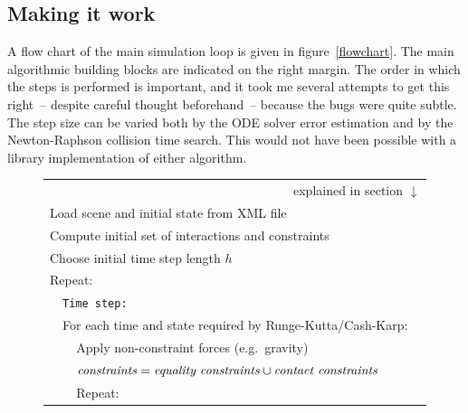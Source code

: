 \subsection{Making it work\label{algorithmImplementation}}

A flow chart of the main simulation loop is given in figure~\ref{flowchart}. The main algorithmic
building blocks are indicated on the right margin. The order in which the steps is performed is
important, and it took me several attempts to get this right~-- despite careful thought
beforehand~-- because the bugs were quite subtle. The step size can be varied both by the ODE
solver error estimation and by the Newton-Raphson collision time search. This would not have
been possible with a library implementation of either algorithm.

\begin{figure}
\renewcommand{\baselinestretch}{1.25}\small\normalsize
\newcommand{\spx}{\vspace*{\baselineskip}\\}
\newcommand{\curly}[2]{\zerobox{b}{\mbox{$\left\}\:#1\begin{array}{l}#2\end{array}\right.$}}}
\begin{tabular}{|l|l|l|l|@{}l}
\multicolumn{5}{r}{explained in section $\downarrow$}\\\cline{1-4}
\multicolumn{4}{|l|}{Load scene and initial state from XML file}
&\curly{\ref{softwareTools}}{\spx}\hspace*{7mm}\\\cline{1-4}
\multicolumn{4}{|l|}{Compute initial set of interactions and constraints}&
\curly{\ref{meshIntersection}}{\spx}\\\cline{1-4}
\multicolumn{4}{|l|}{Choose initial time step length $h$}\\\cline{1-4}
\multicolumn{4}{|l|}{Repeat:}\\\cline{2-4}
    &\multicolumn{3}{|l|}{\texttt{Time step:}}\\\cline{2-4}
    &\multicolumn{3}{|l|}{For each time and state required by Runge-Kutta/Cash-Karp:}&
    \curly{\ref{solvingODEs}}{\spx}\\\cline{3-4}
        &&\multicolumn{2}{|l|}{Apply non-constraint forces (e.g.\ gravity)}\\\cline{3-4}
        &&\multicolumn{2}{|l|}{$\mbox{\textit{constraints}} = \mbox{\textit{equality constraints}}
        \cup \mbox{\textit{contact constraints}}$}\\\cline{3-4}
        &&\multicolumn{2}{|l|}{Repeat:}\\\cline{4-4}

\end{tabular}
\end{figure}
